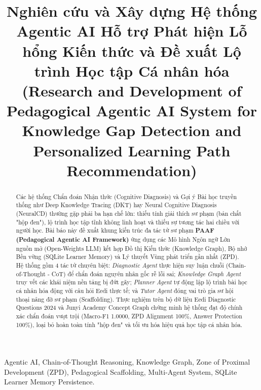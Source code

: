 \documentclass[conference]{IEEEtran}
\begin{document}
\title{Nghiên cứu và Xây dựng Hệ thống Agentic AI Hỗ trợ Phát hiện Lỗ hổng Kiến thức và Đề xuất Lộ trình Học tập Cá nhân hóa\\
\large (Research and Development of Pedagogical Agentic AI System for Knowledge Gap Detection and Personalized Learning Path Recommendation)}

\author{
}

\maketitle

\begin{abstract}
Các hệ thống Chẩn đoán Nhận thức (Cognitive Diagnosis) và Gợi ý Bài học truyền thống như Deep Knowledge Tracing (DKT) hay Neural Cognitive Diagnosis (NeuralCD) thường gặp phải ba hạn chế lớn: thiếu tính giải thích sư phạm (bản chất "hộp đen"), lộ trình học tập tĩnh không linh hoạt và thiếu sự tương tác hai chiều với người học. Bài báo này đề xuất khung kiến trúc đa tác tử sư phạm \textbf{PAAF (Pedagogical Agentic AI Framework)} ứng dụng các Mô hình Ngôn ngữ Lớn nguồn mở (Open-Weights LLM) kết hợp Đồ thị Kiến thức (Knowledge Graph), Bộ nhớ Bền vững (SQLite Learner Memory) và Lý thuyết Vùng phát triển gần nhất (ZPD). Hệ thống gồm 4 tác tử chuyên biệt: \textit{Diagnostic Agent} thực hiện suy luận chuỗi (Chain-of-Thought - CoT) để chẩn đoán nguyên nhân gốc rễ lỗi sai; \textit{Knowledge Graph Agent} truy vết các khái niệm nền tảng bị đứt gãy; \textit{Planner Agent} tự động lập lộ trình bài học cá nhân hóa động với câu hỏi Eedi thực tế; và \textit{Tutor Agent} đóng vai trò gia sư hội thoại nâng đỡ sư phạm (Scaffolding). Thực nghiệm trên bộ dữ liệu Eedi Diagnostic Questions 2024 và Junyi Academy Concept Graph chứng minh hệ thống đạt độ chính xác chẩn đoán vượt trội (Macro-F1 1.0000, ZPD Alignment 100\%, Answer Protection 100\%), loại bỏ hoàn toàn tính "hộp đen" và tối ưu hóa hiệu quả học tập cá nhân hóa.
\end{abstract}

\begin{IEEEkeywords}
Agentic AI, Chain-of-Thought Reasoning, Knowledge Graph, Zone of Proximal Development (ZPD), Pedagogical Scaffolding, Multi-Agent System, SQLite Learner Memory Persistence.
\end{IEEEkeywords}
\end{document}
